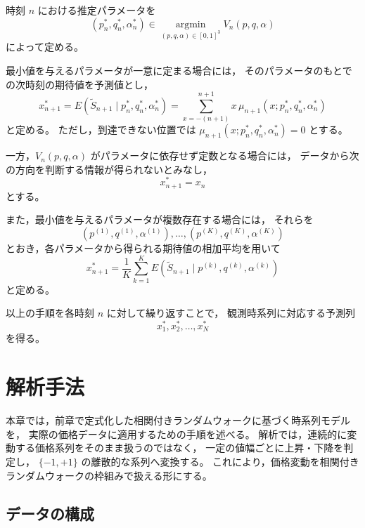 \documentclass[a4j,dvipdfmx]{jsarticle}
\theoremstyle{plainnote}
\begin{document}
時刻 $n$ における推定パラメータを
\begin{equation}
  (p_n^\ast,q_n^\ast,\alpha_n^\ast)
  \in
  \operatorname*{argmin}_{(p,q,\alpha)\in[0,1]^3}
  V_n(p,q,\alpha)
  \label{eq:model_argmin}
\end{equation}
によって定める。

最小値を与えるパラメータが一意に定まる場合には，
そのパラメータのもとでの次時刻の期待値を予測値とし，
\begin{equation}
  x_{n+1}^{\ast}
  =
  E(\tilde{S}_{n+1}\mid p_n^\ast,q_n^\ast,\alpha_n^\ast)
  =
  \sum_{x=-(n+1)}^{n+1}
  x\,\mu_{n+1}(x;p_n^\ast,q_n^\ast,\alpha_n^\ast)
  \label{eq:model_prediction}
\end{equation}
と定める。
ただし，到達できない位置では
$\mu_{n+1}(x;p_n^\ast,q_n^\ast,\alpha_n^\ast)=0$ とする。

一方，$V_n(p,q,\alpha)$ がパラメータに依存せず定数となる場合には，
データから次の方向を判断する情報が得られないとみなし，
\begin{equation}
  x_{n+1}^{\ast}=x_n
  \label{eq:model_prediction_const}
\end{equation}
とする。

また，最小値を与えるパラメータが複数存在する場合には，
それらを
\[
  (p^{(1)},q^{(1)},\alpha^{(1)}),\ldots,
  (p^{(K)},q^{(K)},\alpha^{(K)})
\]
とおき，各パラメータから得られる期待値の相加平均を用いて
\begin{equation}
  x_{n+1}^{\ast}
  =
  \frac{1}{K}
  \sum_{k=1}^{K}
  E(\tilde{S}_{n+1}\mid p^{(k)},q^{(k)},\alpha^{(k)})
  \label{eq:model_prediction_multiple}
\end{equation}
と定める。

以上の手順を各時刻 $n$ に対して繰り返すことで，
観測時系列に対応する予測列
\[
  x_1^\ast,x_2^\ast,\ldots,x_N^\ast
\]
を得る。
\newpage
\section{解析手法}

本章では，前章で定式化した相関付きランダムウォークに基づく時系列モデルを，
実際の価格データに適用するための手順を述べる。
解析では，連続的に変動する価格系列をそのまま扱うのではなく，
一定の値幅ごとに上昇・下降を判定し，
$\{-1,+1\}$ の離散的な系列へ変換する。
これにより，価格変動を相関付きランダムウォークの枠組みで扱える形にする。

\subsection{データの構成}
\end{document}
